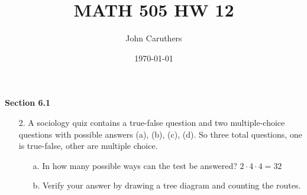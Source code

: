 \documentclass{article}
\title{MATH 505 HW 12}
\author{John Caruthers}
\date\today
\begin{document}
\maketitle

\textbf{Section 6.1}
\begin{itemize}
    \item[2.] A sociology quiz contains a true-false question and two multiple-choice questions with possible answers (a), (b), (c), (d). So three total questions, one is true-false, other are multiple choice.
    \begin{itemize}
        \item[a.] In how many possible ways can the test be answered?
        {\color{blue}$2\cdot4\cdot4=32$}
        \item[b.] Verify your answer by drawing a tree diagram and counting the routes.
    \end{itemize}
\end{itemize}
\end{document}
